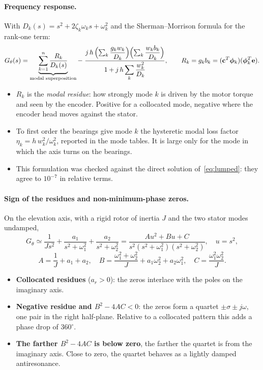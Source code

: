 \documentclass[10pt,a4paper]{article}
\numberwithin{equation}{section}
\begin{document}
\paragraph{Frequency response.} With $D_k(s)=s^2+2\zeta_k\omega_ks+\omega_k^2$ and the Sherman--Morrison formula for the rank-one term:
\begin{equation}
G_\theta(s)=\underbrace{\sum_{k=1}^{n}\frac{R_k}{D_k(s)}}_{\text{modal superposition}}
-\;\frac{j\,h\,\Bigl(\sum_k\dfrac{g_kw_k}{D_k}\Bigr)\Bigl(\sum_k\dfrac{w_kb_k}{D_k}\Bigr)}{1+j\,h\displaystyle\sum_k\frac{w_k^2}{D_k}},\qquad R_k=g_kb_k=(\mathbf c^T\bm\phi_k)(\bm\phi_k^T\mathbf e) .\label{eq:modalfrf}
\end{equation}
\begin{itemize}
\item $R_k$ is the \emph{modal residue}: how strongly mode $k$ is driven by the motor torque and seen by the encoder. Positive for a collocated mode, negative where the encoder head moves against the stator.
\item To first order the bearings give mode $k$ the hysteretic modal loss factor $\eta_k=h\,w_k^2/\omega_k^2$, reported in the mode tables. It is large only for the mode in which the axis turns on the bearings.
\item This formulation was checked against the direct solution of~\eqref{eq:lumped}: they agree to $10^{-7}$ in relative terms.
\end{itemize}

\paragraph{Sign of the residues and non-minimum-phase zeros.} On the elevation axis, with a rigid rotor of inertia $J$ and the two stator modes undamped,
\begin{equation}
G_\theta\simeq\frac{1}{Js^2}+\frac{a_1}{s^2+\omega_1^2}+\frac{a_2}{s^2+\omega_2^2}=\frac{Au^2+Bu+C}{s^2(s^2+\omega_1^2)(s^2+\omega_2^2)},\quad u=s^2,
\end{equation}
\begin{equation}
A=\frac1J+a_1+a_2,\quad B=\frac{\omega_1^2+\omega_2^2}J+a_1\omega_2^2+a_2\omega_1^2,\quad C=\frac{\omega_1^2\omega_2^2}J .
\end{equation}
\begin{itemize}
\item \textbf{Collocated residues} ($a_r>0$): the zeros interlace with the poles on the imaginary axis.
\item \textbf{Negative residue and $B^2-4AC<0$}: the zeros form a quartet $\pm\sigma\pm j\omega$, one pair in the right half-plane. Relative to a collocated pattern this adds a phase drop of 360$^\circ$.
\item \textbf{The farther $B^2-4AC$ is below zero}, the farther the quartet is from the imaginary axis. Close to zero, the quartet behaves as a lightly damped antiresonance.
\end{itemize}
\end{document}
